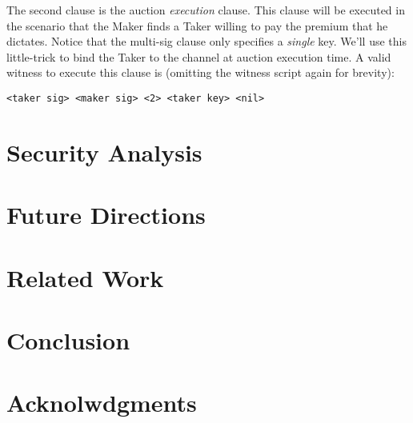 \documentclass[12pt,a4paper]{article}
\theoremstyle{definition}
\begin{document}
 
 
 The second clause is the auction \emph{execution} clause. This clause will be executed in the scenario that the Maker finds a Taker willing to pay the premium that he dictates. Notice that the multi-sig clause only specifies a \emph{single} key. We'll use this little-trick to bind the Taker to the channel at auction execution time. A valid witness to execute this clause is (omitting the witness script again for brevity):
 \begin{verbatim}
<taker sig> <maker sig> <2> <taker key> <nil>
\end{verbatim}

\section{Security Analysis}
\section{Future Directions}
\section{Related Work}
\section{Conclusion}

\section{Acknolwdgments}



\end{document}
